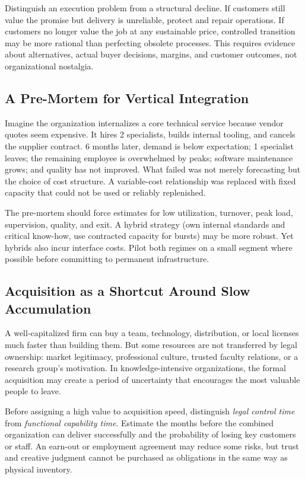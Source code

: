 Distinguish an execution problem from a structural decline. If customers still value the promise but delivery is unreliable, protect and repair operations. If customers no longer value the job at any sustainable price, controlled transition may be more rational than perfecting obsolete processes. This requires evidence about alternatives, actual buyer decisions, margins, and customer outcomes, not organizational nostalgia.

\subsection{A Pre-Mortem for Vertical Integration}
\label{sec:pre_mortem_vertical_integration}

Imagine the organization internalizes a core technical service because vendor quotes seem expensive. It hires 2 specialists, builds internal tooling, and cancels the supplier contract. 6 months later, demand is below expectation; 1 specialist leaves; the remaining employee is overwhelmed by peaks; software maintenance grows; and quality has not improved. What failed was not merely forecasting but the choice of cost structure. A variable-cost relationship was replaced with fixed capacity that could not be used or reliably replenished.

The pre-mortem should force estimates for low utilization, turnover, peak load, supervision, quality, and exit. A hybrid strategy (own internal standards and critical know-how, use contracted capacity for bursts) may be more robust. Yet hybrids also incur interface costs. Pilot both regimes on a small segment where possible before committing to permanent infrastructure.

\subsection{Acquisition as a Shortcut Around Slow Accumulation}
\label{sec:acquisition_shortcut_slow_accumulation}

A well-capitalized firm can buy a team, technology, distribution, or local licenses much faster than building them. But some resources are not transferred by legal ownership: market legitimacy, professional culture, trusted faculty relations, or a research group's motivation. In knowledge-intensive organizations, the formal acquisition may create a period of uncertainty that encourages the most valuable people to leave.

Before assigning a high value to acquisition speed, distinguish \textit{legal control time} from \textit{functional capability time}. Estimate the months before the combined organization can deliver successfully and the probability of losing key customers or staff. An earn-out or employment agreement may reduce some risks, but trust and creative judgment cannot be purchased as obligations in the same way as physical inventory.

